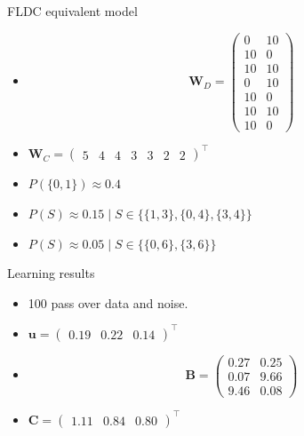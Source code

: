 \documentclass{beamer}
\begin{document}
\begin{frame}{FLDC equivalent model}
  \begin{itemize}
   \item \begin{equation*}
     \mathbf{W}_{D} = \left( \begin{array}{cc}
     0 & 10 \\
     10 & 0 \\
     10 & 10 \\
     0 & 10 \\
     10 & 0 \\
     10 & 10 \\
     10 & 0 \end{array} \right)
   \end{equation*}
    \item $\mathbf{W}_{C} = \left( \begin{array}{ccccccc} 5 & 4 & 4 & 3 & 3 & 2 & 2 \end{array}\right)^{\intercal}$
    \item $P(\{0,1\}) \approx 0.4$
    \item $P(S) \approx 0.15 \mid S \in \{\{1,3\}, \{0,4\}, \{3,4\}\}$
    \item $P(S) \approx 0.05 \mid S \in \{\{0,6\}, \{3,6\}\}$
  \end{itemize}
\end{frame}

\begin{frame}{Learning results}
  \begin{itemize}
    \item 100 pass over data and noise.
    \item $\mathbf{u} = \left( \begin{array}{ccc} 0.19 & 0.22 & 0.14 \end{array}\right)^{\intercal}$
    \item \begin{equation*}
      \mathbf{B} = \left( \begin{array}{cc}
      0.27 & 0.25 \\
      0.07 & 9.66 \\
      9.46 & 0.08 \end{array} \right)
    \end{equation*}
    \item $\mathbf{C} = \left( \begin{array}{ccc} 1.11 & 0.84 & 0.80 \end{array}\right)^{\intercal}$
  \end{itemize}
\end{frame}
\end{document}
